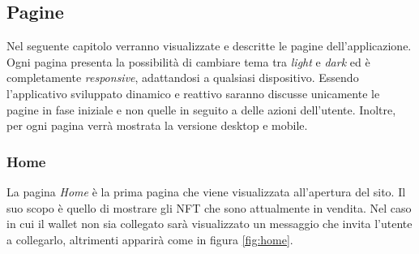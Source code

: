\subsection{Pagine}
Nel seguente capitolo verranno visualizzate e descritte le pagine dell'applicazione. Ogni pagina presenta la possibilità di cambiare tema tra \textit{light} e \textit{dark} ed è completamente \textit{responsive}, adattandosi a qualsiasi dispositivo. Essendo l'applicativo sviluppato dinamico e reattivo saranno discusse unicamente le pagine in fase iniziale e non quelle in seguito a delle azioni dell'utente. Inoltre, per ogni pagina verrà mostrata la versione desktop e mobile.

\subsubsection{Home}

La pagina \textit{Home} è la prima pagina che viene visualizzata all'apertura del sito. Il suo scopo è quello di mostrare gli NFT che sono attualmente in vendita. Nel caso in cui il wallet non sia collegato sarà visualizzato un messaggio che invita l'utente a collegarlo, altrimenti apparirà come in figura \ref{fig:home}.

